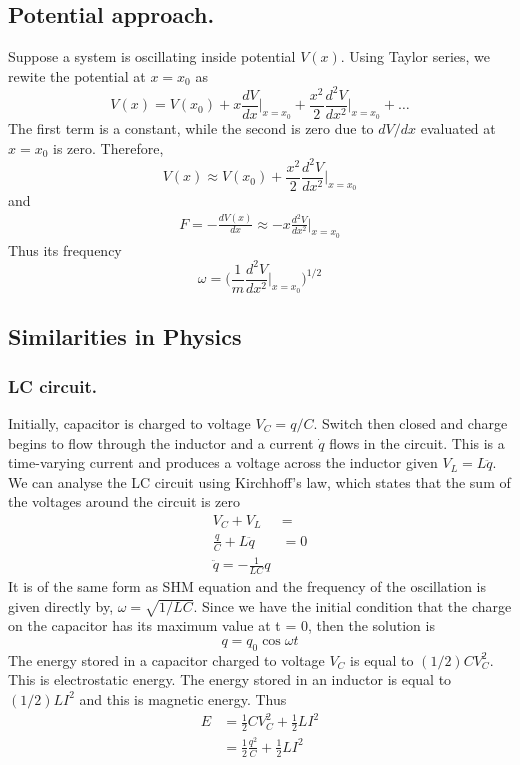 \documentclass[../../../main.tex]{subfiles}
\begin{document}
\subsection{Potential approach.} Suppose a system is oscillating inside potential $V(x)$. Using Taylor series, we rewite the potential at $x=x_0$ as
\begin{equation*}
    V(x)=V(x_0)+x\frac{dV}{dx}\bigg|_{x=x_0}+\frac{x^2}{2}\frac{d^2V}{dx^2}\bigg|_{x=x_0}+\dots
\end{equation*}
The first term is a constant, while the second is zero due to $dV/dx$ evaluated at $x=x_0$ is zero. Therefore, 
\begin{equation*}
    V(x)\approx V(x_0)+\frac{x^2}{2}\frac{d^2V}{dx^2}\bigg|_{x=x_0}
\end{equation*}
and 
\begin{align*}
    F=-\frac{dV(x)}{dx}\approx-x\frac{d^2V}{dx^2}\bigg|_{x=x_0}
\end{align*}
Thus its frequency
\begin{equation*}
    \omega=\biggl(\frac{1}{m}\frac{d^2V}{dx^2}\bigg|_{x=x_0}\biggr)^{1/2}
\end{equation*} 

\subsection{Similarities in Physics}
\subsubsection{LC circuit.} Initially, capacitor is charged to voltage $V_C=q/C$. Switch then closed and  charge begins to flow through the inductor and a current $\dot{q}$ flows in the circuit. This is a time-varying current and produces a voltage across the inductor given $V_L=L\ddot{q}$. We can analyse the LC circuit using Kirchhoff's law, which states that the sum of the voltages around the circuit is zero
\begin{align*}
    V_C+V_L&=\\
    \frac{q}{C}+L\ddot{q}&=0\\
    \ddot{q}=-\frac{1}{LC}q
\end{align*}
It is of the same form as SHM equation and the frequency of the oscillation is given directly by, $\omega = \sqrt{1/LC}$. Since we have the initial condition that the charge on the capacitor has its maximum value at t = 0, then the solution is
\begin{equation*}
    q=q_0\cos\omega t
\end{equation*}
The energy stored in a capacitor charged to voltage $V_C$ is equal to $(1/2) CV_C^2$. This is electrostatic energy. The energy stored in an inductor is equal to $(1/2) LI^2$ and this is magnetic energy. Thus \begin{align*}
    E&=\frac{1}{2}CV_C^2+\frac{1}{2}LI^2\\
    &=\frac{1}{2}\frac{q^2}{C}+\frac{1}{2}LI^2
\end{align*}
\end{document}
